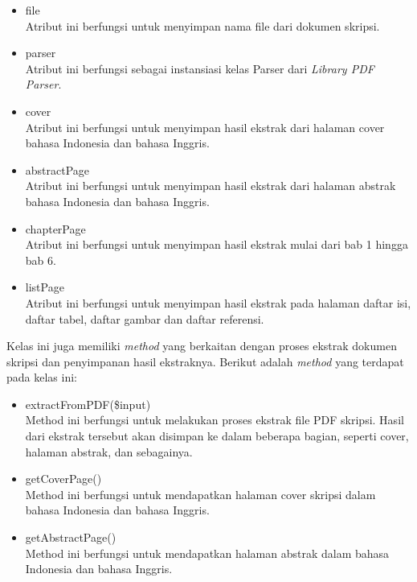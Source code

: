 \begin{enumerate}
		\begin{itemize}
			\item file \\
			Atribut ini berfungsi untuk menyimpan nama file dari dokumen skripsi.
			
			\item parser \\			
			Atribut ini berfungsi sebagai instansiasi kelas Parser dari \textit{Library PDF Parser}.
			
			\item cover \\
			Atribut ini berfungsi untuk menyimpan hasil ekstrak dari halaman cover bahasa Indonesia dan bahasa Inggris.
			
			\item abstractPage \\			
			Atribut ini berfungsi untuk menyimpan hasil ekstrak dari halaman abstrak bahasa Indonesia dan bahasa Inggris.
			
			\item chapterPage \\	
			Atribut ini berfungsi untuk menyimpan hasil ekstrak mulai dari bab 1 hingga bab 6.
			
			\item listPage \\
			Atribut ini berfungsi untuk menyimpan hasil ekstrak pada halaman daftar isi, daftar tabel, daftar gambar dan daftar referensi.
			
		\end{itemize}
	
	Kelas ini juga memiliki \textit{method} yang berkaitan dengan proses ekstrak dokumen skripsi dan penyimpanan hasil ekstraknya. Berikut adalah \textit{method} yang terdapat pada kelas ini:
		
		\begin{itemize}
			\item extractFromPDF(\$input) \\
			Method ini berfungsi untuk melakukan proses ekstrak file PDF skripsi. Hasil dari ekstrak tersebut akan disimpan ke dalam beberapa bagian, seperti cover, halaman abstrak, dan sebagainya. 
			
			\item getCoverPage() \\
			Method ini berfungsi untuk mendapatkan halaman cover skripsi dalam bahasa Indonesia dan bahasa Inggris.
			
			\item getAbstractPage() \\
			Method ini berfungsi untuk mendapatkan halaman abstrak dalam bahasa Indonesia dan bahasa Inggris.
			

\end{itemize}
\end{enumerate}
